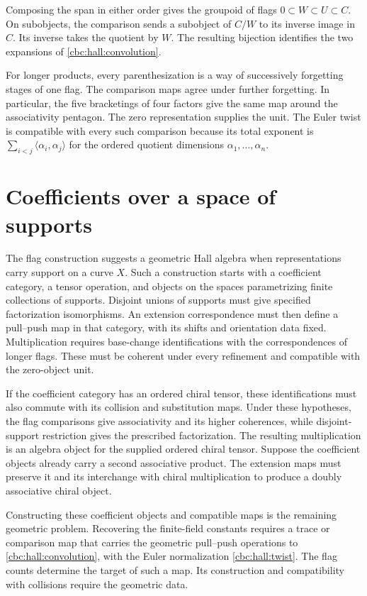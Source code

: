 Composing the span in either order gives the groupoid of flags
$0\subset W\subset U\subset C$.  On subobjects, the comparison sends a
subobject of $C/W$ to its inverse image in $C$.  Its inverse takes the
quotient by $W$.  The resulting bijection identifies the two expansions of
\eqref{cbc:hall:convolution}.

For longer products, every parenthesization
is a way of successively forgetting stages of one flag.  The comparison
maps agree under further forgetting.  In particular, the five bracketings
of four factors give the same map around the associativity pentagon.
The zero representation supplies the unit.  The Euler twist is compatible
with every such comparison because its total exponent is
$\sum_{i<j}\langle\alpha_i,\alpha_j\rangle$ for the ordered quotient
dimensions $\alpha_1,\ldots,\alpha_n$.

\section{Coefficients over a space of supports}
The flag construction suggests a geometric Hall algebra when representations
carry support on a curve $X$.  Such a construction starts with a coefficient
category, a tensor operation, and objects on the spaces parametrizing finite
collections of supports.  Disjoint unions of supports must give specified
factorization isomorphisms.  An extension correspondence must then define a
pull--push map in that category, with its shifts and orientation data fixed.
Multiplication requires base-change
identifications with the correspondences of longer flags.  These must be
coherent under every refinement and compatible with the zero-object unit.

If the coefficient category has an ordered chiral tensor, these
identifications must also commute with its collision and substitution maps.
Under these hypotheses, the flag comparisons give associativity and its
higher coherences, while disjoint-support restriction gives the prescribed
factorization.  The resulting multiplication is an algebra object for the
supplied ordered chiral tensor.  Suppose the coefficient objects already carry a second associative product.
The extension maps must preserve it and its interchange with chiral
multiplication to produce a doubly associative chiral object.

Constructing these coefficient objects and compatible maps is the remaining
geometric problem.  Recovering the finite-field constants requires a trace
or comparison map that carries the geometric pull--push operations to
\eqref{cbc:hall:convolution}, with the Euler normalization
\eqref{cbc:hall:twist}.  The flag counts determine the target of such a map.
Its construction and compatibility with collisions require the geometric data.

